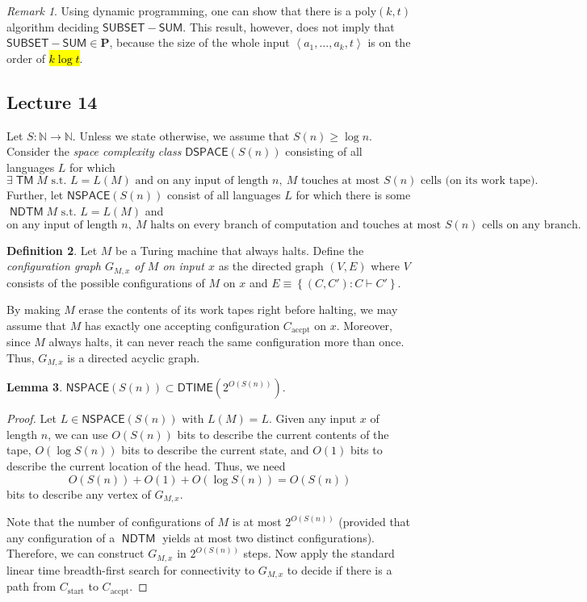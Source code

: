 \documentclass[10pt,letterpaper,cm]{nupset}
\theoremstyle{definition}
\newtheorem{definition}{Definition}[subsection]
\theoremstyle{theorem}
\newtheorem{lemma}[definition]{Lemma}
\theoremstyle{remark}
\newtheorem{remark}[definition]{Remark}
\newcommand{\N}{\mathbb N}
\newcommand{\1}{\mathbf{1}}
\newcommand{\accpt}{\mathrm{accpt}}
\newcommand{\0}{\vec 0}
\DeclareMathOperator{\TM}{\mathsf{TM}}
\DeclareMathOperator{\NDTM}{\mathsf{NDTM}}
\begin{document}
\begin{remark}
Using dynamic programming, one can show that there is a poly$\left(k, t\right)$ algorithm deciding $\mathsf{SUBSET{-}SUM}$. This result, however, does not imply that $\mathsf{SUBSET{-}SUM} \in \mathbf{P}$, because the size of the whole input $\left\langle a_1, \ldots, a_k, t\right\rangle$ is on the order of \hl{$k\log{t}$}.
\end{remark}

\subsection{Lecture 14}

Let $S: \N \to \N$. Unless we state otherwise, we assume that $S(n) \geq \log{n}$.
Consider the \textit{space complexity class} 
$\mathsf{DSPACE}(S(n))$ consisting of all languages $L$ for which $$\exists \TM M\text{ s.t. }L = L(M) \text{ and on any input of length }n,\ M \text{ touches at most }S(n)\text{ cells (on its work tape)}.$$
Further, let $\mathsf{NSPACE}(S(n))$ consist of all languages $L$ for which  there is some $\NDTM M\text{ s.t. } L = L(M)$ and
\[
\text{on any input of length }n,\ M\text{ halts on every branch of computation and touches at most }S(n)\text{ cells on any branch}.
\]


\begin{definition}\label{Configg}
Let $M$ be a Turing machine that always halts. Define the \textit{configuration graph $G_{M,x}$ of $M$ on input $x$} as the directed graph $\left(V, E\right)$ where $V$ consists of the possible configurations of $M$ on $x$ and $E \equiv \left\{\left(C,C'\right) : C \vdash C'\right\}$.
\end{definition}

 By making $M$ erase the contents of its work tapes right before halting, we may assume that $M$ has exactly one accepting configuration $C_{\accpt}$ on $x$.
Moreover,
since $M$ always halts, it can never reach the same configuration more than once. Thus, $G_{M,x}$ is a directed acyclic graph.  


\begin{lemma}
$\mathsf{NSPACE}(S(n)) \subset \mathsf{DTIME}\left(2^{O(S(n))}\right)$.
\end{lemma}
\begin{proof}
Let $L \in \mathsf{NSPACE}(S(n)) $ with $L(M) = L$.  Given any input $x$ of length $n$, we can use $O(S(n))$ bits to describe the current contents of the tape, $O(\log{S(n)})$ bits to describe the current state, and $O(1)$ bits to describe the current location of the head. Thus, we need $$O(S(n)) + O(1) + O(\log{S(n)})= O(S(n))$$ bits to describe any vertex of $G_{M,x}$. 

Note that the number of configurations of $M$ is at most $2^{O(S(n))}$ (provided that any configuration of a $\NDTM$ yields at most two distinct configurations).  Therefore, we can construct $G_{M,x}$ in $2^{O(S(n))}$ steps. Now apply the standard linear time breadth-first search for connectivity to $G_{M,x}$ to decide if there is a path from $C_{\mathrm{start}}$ to $C_{\accpt}$. 
\end{proof}
\end{document}
